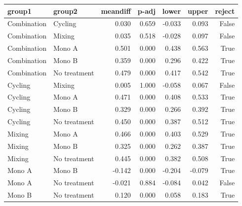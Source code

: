 \begin{tabular}{llrrrrr}
\toprule
group1 & group2 & meandiff & p-adj & lower & upper & reject \\
\midrule
Combination & Cycling & 0.030 & 0.659 & -0.033 & 0.093 & False \\
Combination & Mixing & 0.035 & 0.518 & -0.028 & 0.097 & False \\
Combination & Mono A & 0.501 & 0.000 & 0.438 & 0.563 & True \\
Combination & Mono B & 0.359 & 0.000 & 0.296 & 0.422 & True \\
Combination & No treatment & 0.479 & 0.000 & 0.417 & 0.542 & True \\
Cycling & Mixing & 0.005 & 1.000 & -0.058 & 0.067 & False \\
Cycling & Mono A & 0.471 & 0.000 & 0.408 & 0.533 & True \\
Cycling & Mono B & 0.329 & 0.000 & 0.266 & 0.392 & True \\
Cycling & No treatment & 0.450 & 0.000 & 0.387 & 0.512 & True \\
Mixing & Mono A & 0.466 & 0.000 & 0.403 & 0.529 & True \\
Mixing & Mono B & 0.325 & 0.000 & 0.262 & 0.387 & True \\
Mixing & No treatment & 0.445 & 0.000 & 0.382 & 0.508 & True \\
Mono A & Mono B & -0.142 & 0.000 & -0.204 & -0.079 & True \\
Mono A & No treatment & -0.021 & 0.884 & -0.084 & 0.042 & False \\
Mono B & No treatment & 0.120 & 0.000 & 0.058 & 0.183 & True \\
\bottomrule
\end{tabular}
